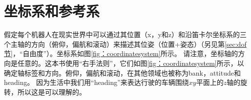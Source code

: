 \section{坐标系和参考系}\label{sec:coordsystems}


假定每个机器人在现实世界中可以通过其位置（x，y和z）和沿笛卡尔坐标系的三个主轴的方向（俯仰，偏航和滚动）来描述其位姿（位置+姿态）（另见第\ref{sec:dof节}，“自由度”）。坐标系如图\ref{fig：coordinatesystem}所示。 请注意，坐标轴的方向是任意的。这本书使用“右手法则”，它们如图\ref {fig：coordinatesystem}所示，以确定轴标签和方向。俯仰，偏航和滚动，在其他领域也被称为bank，attitude和heading。   因为生活中我们用“heading”来表达行驶的车辆围绕$xy$平面上的$z$轴的旋转，所以这是可以理解的。

